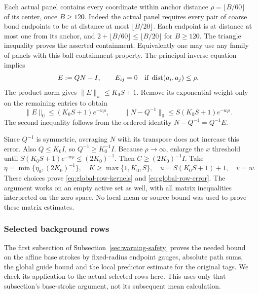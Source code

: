 Each actual panel contains every coordinate within anchor distance
$\rho=\lfloor B/60\rfloor$ of its center, once $B\ge120$.
Indeed the actual panel requires every pair of coarse bond endpoints
to be at distance at most $\lfloor B/20\rfloor$. Each endpoint is at
distance at most one from its anchor, and
$2+\lfloor B/60\rfloor\le\lfloor B/20\rfloor$ for $B\ge120$.
The triangle inequality proves the asserted containment. Equivalently one
may use any family of panels with this ball-containment property.
The principal-inverse equation implies
\[
            E:=QN-I,\qquad E_{ij}=0
                 \quad\hbox{if }\operatorname{dist}(a_i,a_j)\le\rho.
\]
The product norm gives $\|E\|_w\le K_0S+1$. Remove its exponential
weight only on the remaining entries to obtain
\[
 \|E\|_0\le(K_0S+1)e^{-w\rho},\qquad
 \|N-Q^{-1}\|_0\le S(K_0S+1)e^{-w\rho}.
\]
The second inequality follows from the ordered identity
$N-Q^{-1}=Q^{-1}E$.

Since $Q^{-1}$ is symmetric, averaging $N$ with its transpose does
not increase this error. Also $Q\le K_0 I$, so
$Q^{-1}\ge K_0^{-1}I$. Because $\rho\to\infty$, enlarge the
$x$ threshold until $S(K_0S+1)e^{-w\rho}\le(2K_0)^{-1}$.
Then $C\ge(2K_0)^{-1}I$. Take
\[
 \eta=\min\{\eta_0,(2K_0)^{-1}\},\quad
 K\ge\max\{1,K_0,S\},\quad
 u=S(K_0S+1)+1,\quad v=w.
\]
These choices prove \eqref{eq:global-row-kernels} and
\eqref{eq:global-row-error}. The argument works on an empty active
set as well, with all matrix inequalities interpreted on the zero
space. No local mean or source bound was used to prove these matrix
estimates.

\subsubsection{Selected background rows}

The first subsection of Subsection~\ref{sec:warning-safety} proves the
needed bound on the affine base strokes by fixed-radius endpoint gauges,
absolute path sums, the global guide bound and the local predictor
estimate for the original tags. We check its application to the actual
selected rows here. This uses only that subsection's base-stroke argument,
not its subsequent mean calculation.

